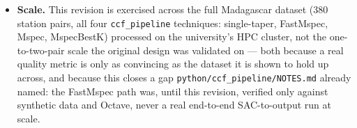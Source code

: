 \documentclass[11pt]{article}
\begin{document}
\begin{itemize}[nosep]
    a three-typed-event barcode was not wrong in principle --- maxima and minima do carry real
    information (Hawkins and Sambridge, 2019) --- only the naive detection-and-filtering
    implementation was. seislib's \texttt{bad\_quality} criteria are defined specifically for
    zero-crossings; designing an analogous, principled quality gate for turning points remains a
    named, open item (tracked in \texttt{docs/notebook5\_revamp\_progress.md}), to be revisited
    once the zero-crossing-based picker is validated at full dataset scale, not before.
  \item \textbf{Scale.} This revision is exercised across the full Madagascar dataset (380 station
    pairs, all four \texttt{ccf\_pipeline} techniques: single-taper, FastMspec, Mspec,
    MspecBestK) processed on the university's HPC cluster, not the one-to-two-pair scale the
    original design was validated on --- both because a real quality metric is only as convincing
    as the dataset it is shown to hold up across, and because this closes a gap
    \texttt{python/ccf\_pipeline/NOTES.md} already named: the FastMspec path was, until this
    revision, verified only against synthetic data and Octave, never a real end-to-end
    SAC-to-output run at scale.
\end{itemize}
\end{document}
